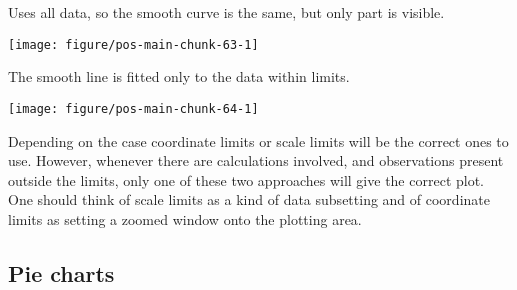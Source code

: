 \documentclass[krantz2]{krantz}\usepackage{knitr}%
\begin{document}
Uses all data, so the smooth curve is the same, but only part is visible.

\begin{knitrout}\footnotesize
{}\color{fgcolor}\begin{kframe}
\begin{alltt}
 \hlopt{+} \hlstd{(} \hlstd{=} \hlstd{(}\hlstd{,} \hlstd{))}
\end{alltt}
\end{kframe}

{\centering \texttt{[image: figure/pos-main-chunk-63-1]} 

}



\end{knitrout}

The smooth line is fitted only to the data within limits.

\begin{knitrout}\footnotesize
{}\color{fgcolor}\begin{kframe}
\begin{alltt}
 \hlopt{+} \hlstd{(}\hlstd{,} \hlstd{)}
\end{alltt}


{\ttfamily\noindent\color{warningcolor}{\#\# Warning: Removed 10 rows containing non-finite values (stat\_smooth).}}

{\ttfamily\noindent\color{warningcolor}{\#\# Warning: Removed 10 rows containing missing values (geom\_point).}}\end{kframe}

{\centering \texttt{[image: figure/pos-main-chunk-64-1]} 

}



\end{knitrout}

Depending on the case coordinate limits or scale limits will be the correct ones to use. However, whenever there are calculations involved, and observations present outside the limits, only one of these two approaches will give the correct plot. One should think of scale limits as a kind of data subsetting and of coordinate limits as setting a zoomed window onto the plotting area.

\subsection{Pie charts}
\end{document}
